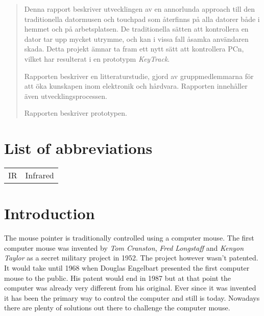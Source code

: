 \documentclass[a4paper,11pt]{article}
\begin{document}
\renewcommand{\abstractname}{Sammandrag}
\begin{abstract}
Denna rapport beskriver utvecklingen av en annorlunda approach till den traditionella
datormusen och touchpad som återfinns på alla datorer både i hemmet och på arbetsplatsen.
De traditionella sätten att kontrollera en dator tar upp mycket utrymme, och kan i vissa 
fall åsamka användaren skada. Detta projekt ämnar ta fram ett nytt sätt att kontrollera PCn,
vilket har resulterat i en prototypm \emph{KeyTrack}.

Rapporten beskriver en litteraturstudie, gjord av gruppmedlemmarna för att öka kunskapen inom
elektronik och hårdvara. Rapporten innehåller även utvecklingsprocessen.

Rapporten beskriver prototypen.


\end{abstract}
\newpage

\tableofcontents
\newpage

\section*{List of abbreviations}
	\begin{tabular}{l r}
		IR & Infrared



	\end{tabular}
\newpage

\setcounter{page}{1}
\section{Introduction}
The mouse pointer is traditionally controlled using a computer mouse.
The first computer mouse was invented by \emph{Tom Cranston}, \emph{Fred Longstaff} and 
\emph{Kenyon Taylor} as a secret military project in 1952. The project however wasn't 
patented. It would take until 1968 when Douglas Engelbart presented the 
first computer mouse to the public. His patent would end in 1987 but at that point the 
computer was already very different from his original. Ever since
it was invented it has been the primary way to control the computer and still is today. Nowadays
there are plenty of solutions out there to challenge the computer mouse.
\end{document}
